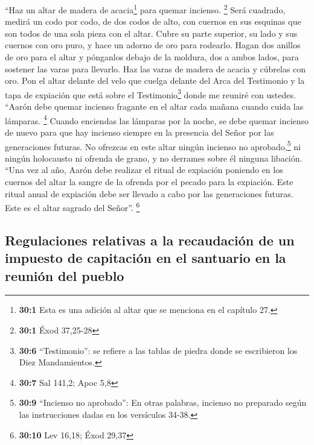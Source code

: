  ``Haz un altar de madera de acacia\footnote{\textbf{30:1}
  Esta es una adición al altar que se menciona en el capítulo 27.} para
quemar incienso. \footnote{\textbf{30:1} Éxod 37,25-28} 
Será cuadrado, medirá un codo por codo, de dos codos de alto, con
cuernos en sus esquinas que son todos de una sola pieza con el altar.
 Cubre su parte superior, su lado y sus cuernos con oro
puro, y hace un adorno de oro para rodearlo.  Hagan dos
anillos de oro para el altar y pónganlos debajo de la moldura, dos a
ambos lados, para sostener las varas para llevarlo.  Haz
las varas de madera de acacia y cúbrelas con oro.  Pon el
altar delante del velo que cuelga delante del Arca del Testimonio y la
tapa de expiación que está sobre el Testimonio\footnote{\textbf{30:6}
  ``Testimonio'': se refiere a las tablas de piedra donde se escribieron
  los Diez Mandamientos.} donde me reuniré con ustedes. 
``Aarón debe quemar incienso fragante en el altar cada mañana cuando
cuida las lámparas. \footnote{\textbf{30:7} Sal 141,2; Apoc 5,8}
 Cuando enciendas las lámparas por la noche, se debe
quemar incienso de nuevo para que hay incienso siempre en la presencia
del Señor por las generaciones futuras.  No ofrezcas en
este altar ningún incienso no aprobado,\footnote{\textbf{30:9}
  ``Incienso no aprobado'': En otras palabras, incienso no preparado
  según las instrucciones dadas en los versículos 34-38.} ni ningún
holocausto ni ofrenda de grano, y no derrames sobre él ninguna libación.
 ``Una vez al año, Aarón debe realizar el ritual de
expiación poniendo en los cuernos del altar la sangre de la ofrenda por
el pecado para la expiación. Este ritual anual de expiación debe ser
llevado a cabo por las generaciones futuras. Este es el altar sagrado
del Señor''. \footnote{\textbf{30:10} Lev 16,18; Éxod 29,37}

\hypertarget{regulaciones-relativas-a-la-recaudaciuxf3n-de-un-impuesto-de-capitaciuxf3n-en-el-santuario-en-la-reuniuxf3n-del-pueblo}{%
\subsection{Regulaciones relativas a la recaudación de un impuesto de
capitación en el santuario en la reunión del
pueblo}\label{regulaciones-relativas-a-la-recaudaciuxf3n-de-un-impuesto-de-capitaciuxf3n-en-el-santuario-en-la-reuniuxf3n-del-pueblo}}

